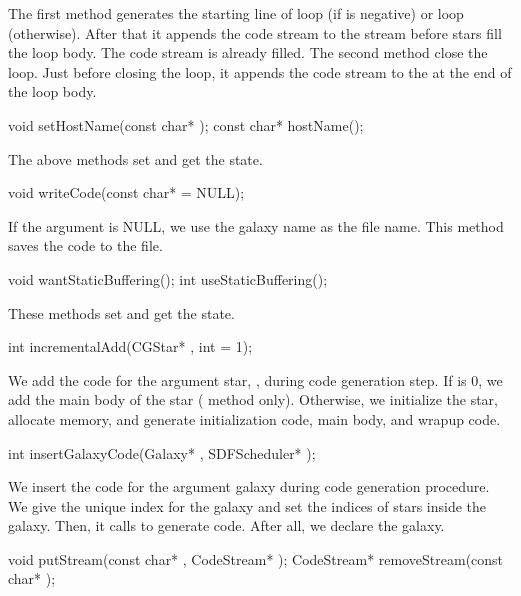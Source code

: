 {The first method generates the starting line of  loop
(if  is negative) or  loop (otherwise).
After that it appends the  code stream to the 
stream before stars fill the loop body. The  code stream
is already filled. The second method close the loop. Just before closing
the loop, it appends the  code stream to the 
at the end of the loop body.

\begin{example}
void setHostName(const char* );
const char* hostName();
\end{example}

The above methods set and get the  state.

\begin{example}
void writeCode(const char*  = NULL);
\end{example}

If the argument is NULL, we use the galaxy name as the file name.
This method saves the code to the file.

\begin{example}
void wantStaticBuffering();
int useStaticBuffering();
\end{example}

These methods set and get the  state.

\begin{example}
int incrementalAdd(CGStar* , int  = 1);
\end{example}

We add the code for the argument star, ,  during code generation step.
If  is 0,
we add the main body of the star ( method only). Otherwise,
we initialize the star, allocate memory, and generate initialization code,
main body, and wrapup code.

\begin{example}
int insertGalaxyCode(Galaxy* , SDFScheduler* );
\end{example}

We insert the code for the argument galaxy during code generation procedure.
We give the unique index for the galaxy and set the indices of stars inside
the galaxy. Then, it calls  to generate
code. After all, we declare the galaxy.

\begin{example}
void putStream(const char* , CodeStream* );
CodeStream* removeStream(const char* );
\end{example}

}
